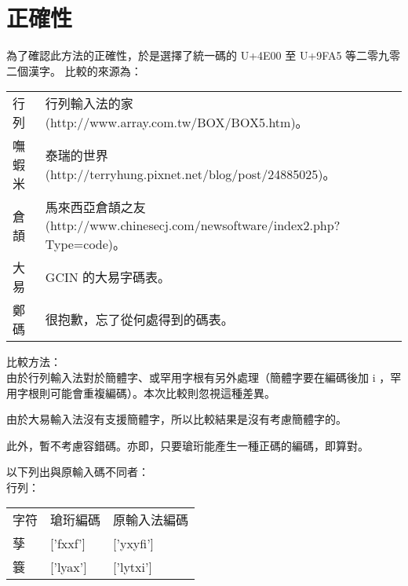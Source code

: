 \chapter{正確性}
為了確認此方法的正確性，於是選擇了統一碼的 U+4E00 至 U+9FA5 等二零九零二個漢字。
比較的來源為：

\begin{tabular}[t]{ll}
行列 & 行列輸入法的家(http://www.array.com.tw/BOX/BOX5.htm)。\\
嘸蝦米 & 泰瑞的世界(http://terryhung.pixnet.net/blog/post/24885025)。\\
倉頡 & 馬來西亞倉頡之友(http://www.chinesecj.com/newsoftware/index2.php?Type=code)。\\
大易 & GCIN 的大易字碼表。\\
鄭碼 & 很抱歉，忘了從何處得到的碼表。\\
\end{tabular}

比較方法：\\
由於行列輸入法對於簡體字、或罕用字根有另外處理（簡體字要在編碼後加 i ，罕用字根則可能會重複編碼）。本次比較則忽視這種差異。

由於大易輸入法沒有支援簡體字，所以比較結果是沒有考慮簡體字的。

此外，暫不考慮容錯碼。亦即，只要瑲珩能產生一種正碼的編碼，即算對。

以下列出與原輸入碼不同者：\\
行列：\\
\begin{tabular}[t]{lll}
字符 & 瑲珩編碼 & 原輸入法編碼\\
孶 & ['fxxf'] & ['yxyfi']\\
簔 & ['lyax'] & ['lytxi']\\
\end{tabular}

